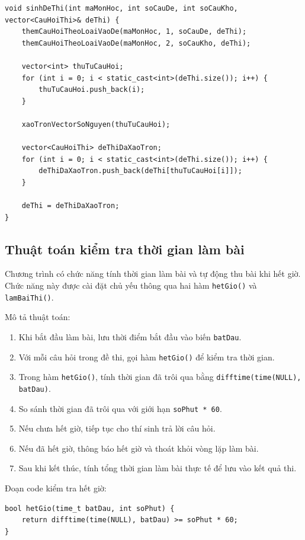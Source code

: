 \documentclass[12pt,a4paper]{report}
\begin{document}
\begin{lstlisting}[style=cppstyle, caption={Hàm sinh đề thi}]
void sinhDeThi(int maMonHoc, int soCauDe, int soCauKho, vector<CauHoiThi>& deThi) {
    themCauHoiTheoLoaiVaoDe(maMonHoc, 1, soCauDe, deThi);
    themCauHoiTheoLoaiVaoDe(maMonHoc, 2, soCauKho, deThi);

    vector<int> thuTuCauHoi;
    for (int i = 0; i < static_cast<int>(deThi.size()); i++) {
        thuTuCauHoi.push_back(i);
    }

    xaoTronVectorSoNguyen(thuTuCauHoi);

    vector<CauHoiThi> deThiDaXaoTron;
    for (int i = 0; i < static_cast<int>(deThi.size()); i++) {
        deThiDaXaoTron.push_back(deThi[thuTuCauHoi[i]]);
    }

    deThi = deThiDaXaoTron;
}
\end{lstlisting}

\subsection{Thuật toán kiểm tra thời gian làm bài}

Chương trình có chức năng tính thời gian làm bài và tự động thu bài khi hết giờ. Chức năng này được cài đặt chủ yếu thông qua hai hàm \texttt{hetGio()} và \texttt{lamBaiThi()}.

Mô tả thuật toán:

\begin{enumerate}
    \item Khi bắt đầu làm bài, lưu thời điểm bắt đầu vào biến \texttt{batDau}.
    \item Với mỗi câu hỏi trong đề thi, gọi hàm \texttt{hetGio()} để kiểm tra thời gian.
    \item Trong hàm \texttt{hetGio()}, tính thời gian đã trôi qua bằng \texttt{difftime(time(NULL), batDau)}.
    \item So sánh thời gian đã trôi qua với giới hạn \texttt{soPhut * 60}.
    \item Nếu chưa hết giờ, tiếp tục cho thí sinh trả lời câu hỏi.
    \item Nếu đã hết giờ, thông báo hết giờ và thoát khỏi vòng lặp làm bài.
    \item Sau khi kết thúc, tính tổng thời gian làm bài thực tế để lưu vào kết quả thi.
\end{enumerate}

Đoạn code kiểm tra hết giờ:

\begin{lstlisting}[style=cppstyle, caption={Hàm kiểm tra hết giờ}]
bool hetGio(time_t batDau, int soPhut) {
    return difftime(time(NULL), batDau) >= soPhut * 60;
}
\end{lstlisting}
\end{document}
